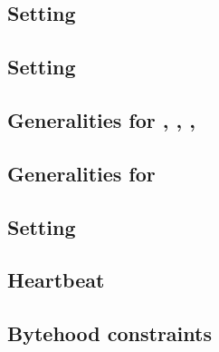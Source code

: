 \subsection{Setting \accInputs{}}                                           \label{bls data: setting acc pairings}                               
\subsection{Setting \internalChecksPassed{}}                                \label{bls data: setting internal checks have passed}                

\subsection{Generalities for \cOneMembershipTestRequired{}, \cTwoMembershipTestRequired{}, \gOneMembershipTestRequired{}, \gTwoMembershipTestRequired{}}                     \label{bls: generalities for membership test}                        

\subsection{Generalities for \acceptablePairOfPoints{}}                     \label{bls data: generalities for acceptable pairs of points}        

\subsection{Setting \trivialPairing{}}                                      \label{bls: setting trivial pairing}                                 

\subsection{Heartbeat}                                                      \label{bls data: heartbeat}                                          
\subsection{Bytehood constraints}                                           \label{bls: bytehood and accumulator}                                
